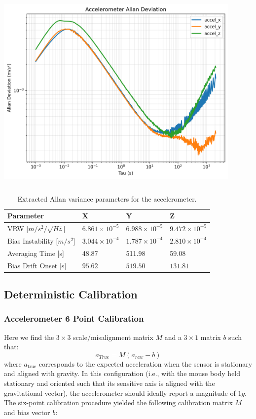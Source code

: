 \documentclass[10pt]{article}
\begin{document}
\begin{center}
    \includegraphics[width=12cm, height=10cm]{accel_allan.png} %
\end{center}

\begin{table}[h!]
    \centering
    \begin{tabularx}{\linewidth}{@{}l XXX@{}}
    \toprule
    \textbf{Parameter} & \textbf{X} & \textbf{Y} & \textbf{Z} \\
    \midrule
    VRW [$m/s^2/\sqrt{Hz}$] & $6.861 \times 10^{-5}$ & $6.988 \times 10^{-5}$ & $9.472 \times 10^{-5}$ \\
    Bias Instability [$m/s^2$] & $3.044 \times 10^{-4}$ & $1.787 \times 10^{-4}$ & $2.810 \times 10^{-4}$ \\
    Averaging Time [s] &  48.87 & 511.98 & 59.08 \\
    Bias Drift Onset [s] & $95.62$ & $519.50$ & $131.81$ \\
    \bottomrule
    \end{tabularx}
    \caption{Extracted Allan variance parameters for the accelerometer.}
\end{table}




\subsection*{Deterministic Calibration}
\subsubsection*{Accelerometer 6 Point Calibration} Here we  find the 
$3\times3$ scale/misalignment matrix $M$ and a $3\times1$ matrix
$b$ such that:
$$
a_{True} = M(a_{raw} - b)
$$
where $a_{\text{true}}$ corresponds to the expected acceleration when the sensor 
is stationary and aligned with gravity. In this configuration 
(i.e., with the mouse body held stationary and oriented such that its sensitive 
axis is aligned with the gravitational vector), the accelerometer should ideally 
report a magnitude of $1g$. The six-point calibration procedure yielded the 
following calibration matrix $M$ and bias vector $b$:
\end{document}
